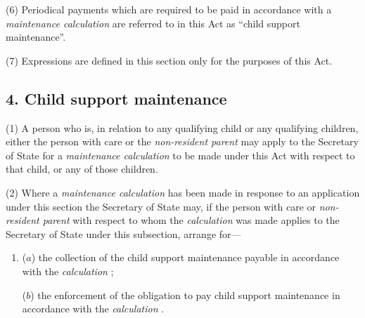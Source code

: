 \documentclass[12pt,a4paper]{article}
\begin{document}
(6) Periodical payments which are required to be paid in accordance with a 
\emph{maintenance calculation}  %
are referred to in this Act as “child support maintenance”.

(7) Expressions are defined in this section only for the purposes of this Act.


\subsection{4. Child support maintenance}

(1) A person who is, in relation to any qualifying child or any qualifying children, either the person with care or the 
\emph{non-resident parent}  %
may apply to the 
Secretary of State  %
for a 
\emph{maintenance calculation}  %
to be made under this Act with respect to that child, or any of those children.

(2) Where a 
\emph{maintenance calculation}  %
has been made in response to an application under this section the 
Secretary of State  %
may, if the person with care or 
\emph{non-resident parent}  %
with respect to whom the 
\emph{calculation}  %
was made applies to 
the Secretary of State  %
under this subsection, arrange for—
\begin{enumerate}\item[]
($a$) the collection of the child support maintenance payable in accordance with the 
\emph{calculation}%
;

($b$) the enforcement of the obligation to pay child support maintenance in accordance with the 
\emph{calculation}%
.
\end{enumerate}
\end{document}
